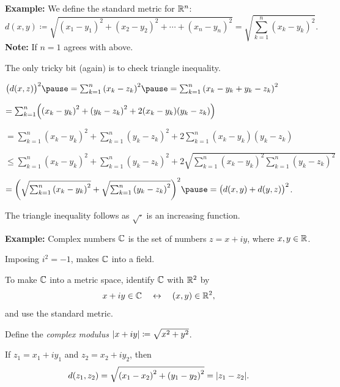 \documentclass[10pt,aspectratio=169]{beamer}
\begin{document}
\begin{frame}

\textbf{Example:}
We define the
standard metric for ${\mathbb{R}}^n$:
\begin{equation*}
d(x,y) \coloneqq
\sqrt{
{(x_1-y_1)}^2 + 
{(x_2-y_2)}^2 + 
\cdots +
{(x_n-y_n)}^2
} =
\sqrt{
\sum_{k=1}^n
{(x_k-y_k)}^2 
} .
\end{equation*}
\pause
\textbf{Note:} If $n=1$ agrees with above.

\pause
\medskip

The only tricky bit (again) is to check triangle inequality.

\pause
\medskip

$
{\bigl(d(x,z)\bigr)}^2
\pause
=
\sum_{k=1}^n
{(x_k-z_k)}^2 
\pause
=
\sum_{k=1}^n
{(x_k-y_k+y_k-z_k)}^2 
$

\pause
\medskip

\quad
$
=
\sum_{k=1}^n
\Bigl(
{(x_k-y_k)}^2+{(y_k-z_k)}^2 + 2(x_k-y_k)(y_k-z_k)
\Bigr)
$

\pause
\medskip

\quad
$
=
\sum_{k=1}^n
{(x_k-y_k)}^2
+
\sum_{k=1}^n
{(y_k-z_k)}^2 
+
2
\sum_{k=1}^n
(x_k-y_k)(y_k-z_k)
$

\pause
\medskip

\quad
$
\leq
\sum_{k=1}^n
{(x_k-y_k)}^2
+
\sum_{k=1}^n
{(y_k-z_k)}^2 
+
2
\sqrt{
\sum_{k=1}^n
{(x_k-y_k)}^2
\sum_{k=1}^n
{(y_k-z_k)}^2
}
$

\pause
\medskip

\quad
$
=
{\left(
\sqrt{
\sum_{k=1}^n
{(x_k-y_k)}^2
}
+
\sqrt{
\sum_{k=1}^n
{(y_k-z_k)}^2 
}
\right)}^2
\pause
=
{\bigl( d(x,y) + d(y,z) \bigr)}^2$.

\pause
\medskip

The triangle inequality follows as $\sqrt{\cdot}$ is an increasing function.

\end{frame}

\begin{frame}

\textbf{Example:}
Complex numbers ${\mathbb{C}}$ is the set of numbers $z = x+iy$, where $x,y \in {\mathbb{R}}$.

\pause
\medskip

Imposing $i^2 = -1$, makes ${\mathbb{C}}$ into a field.

\pause
\medskip

To make ${\mathbb{C}}$ into a metric space, identify ${\mathbb{C}}$ with ${\mathbb{R}}^2$ by
\[
x+iy \in {\mathbb{C}} \quad \leftrightarrow \quad (x,y) \in {\mathbb{R}}^2 ,
\]
and use the standard metric.

\pause
\medskip

Define the \emph{complex modulus} $\lvert {x+iy} \rvert \coloneqq \sqrt{x^2+y^2}$.

\pause
\medskip

If $z_1 = x_1 + iy_1$ and $z_2 = x_2 + iy_2$, then
\[
d(z_1,z_2) = \sqrt{{(x_1-x_2)}^2+ {(y_1-y_2)}^2} = \lvert {z_1-z_2} \rvert.
\]
\end{frame}
\end{document}
